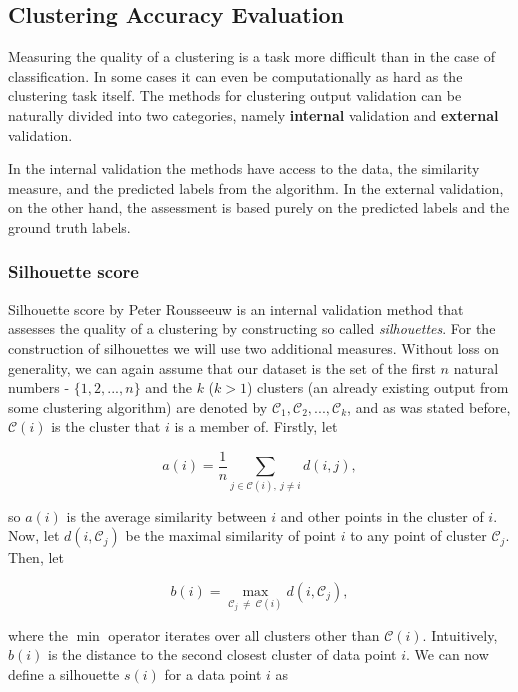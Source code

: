 \subsection{Clustering Accuracy Evaluation}
Measuring the quality of a clustering is a task more difficult than in the case of classification. In some cases it can even be computationally as hard as the clustering task itself. The methods for clustering output validation can be naturally divided into two categories, namely \textbf{internal} validation and \textbf{external} validation.

In the internal validation the methods have access to the data, the similarity measure, and the predicted labels from the algorithm. In the external validation, on the other hand, the assessment is based purely on the predicted labels and the ground truth labels.

\subsubsection{Silhouette score}
Silhouette score by Peter Rousseeuw \cite{rousseeuw1987silhouettes} is an internal validation method that assesses the quality of a clustering by constructing so called \textit{silhouettes}.
For the construction of silhouettes we will use two additional measures. Without loss on generality, we can again assume that our dataset is the set of the first $n$ natural numbers - $\{ 1, 2, ..., n\}$ and the $k$ ($k > 1$) clusters (an already existing output from some clustering algorithm) are denoted by $\mathcal{C}_1, \mathcal{C}_2, ..., \mathcal{C}_k$, and as was stated before, $\mathcal{C}(i)$ is the cluster that $i$ is a member of. Firstly, let

\begin{equation}
    a(i) = \frac{1}{n} \sum_{j \in \mathcal{C}(i),~ j \neq i} d(i, j),
\end{equation}

so $a(i)$ is the average similarity between $i$ and other points in the cluster of $i$. Now, let $d(i, \mathcal{C}_j)$ be the maximal similarity of point $i$ to any point of cluster $\mathcal{C}_j$. Then, let

\begin{equation}
    b(i) = \max_{\mathcal{C}_j ~\neq~ \mathcal{C}(i)} d(i, \mathcal{C}_j),
\end{equation}

where the $\min$ operator iterates over all clusters other than $\mathcal{C}(i)$. Intuitively, $b(i)$ is the distance to the second closest cluster of data point $i$. We can now  define a silhouette $s(i)$ for a data point $i$ as

